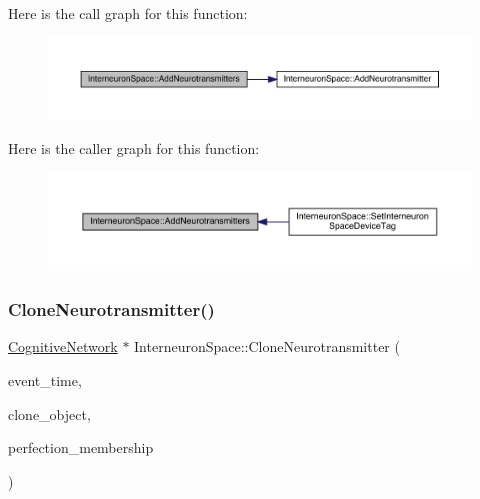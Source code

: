 Here is the call graph for this function\+:\nopagebreak
\begin{figure}[H]
\begin{center}
\leavevmode
\includegraphics[width=350pt]{class_interneuron_space_a1049397cd511c753d8c178db8f68a1a7_cgraph}
\end{center}
\end{figure}
Here is the caller graph for this function\+:\nopagebreak
\begin{figure}[H]
\begin{center}
\leavevmode
\includegraphics[width=350pt]{class_interneuron_space_a1049397cd511c753d8c178db8f68a1a7_icgraph}
\end{center}
\end{figure}
\mbox{\label{class_interneuron_space_a96149bba4c6efd03586700a6fe86960a}} 
\subsubsection{\texorpdfstring{Clone\+Neurotransmitter()}{CloneNeurotransmitter()}}
{\footnotesize\ttfamily \hyperlink{class_cognitive_network}{Cognitive\+Network} $\ast$ Interneuron\+Space\+::\+Clone\+Neurotransmitter (\begin{DoxyParamCaption}\item[{std\+::chrono\+::time\+\_\+point$<$ \hyperlink{universe_8h_a0ef8d951d1ca5ab3cfaf7ab4c7a6fd80}{Clock} $>$}]{event\+\_\+time,  }\item[{\hyperlink{class_cognitive_network}{Cognitive\+Network} $\ast$}]{clone\+\_\+object,  }\item[{double}]{perfection\+\_\+membership }\end{DoxyParamCaption})}




